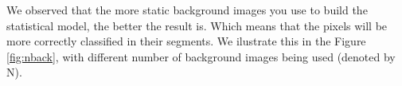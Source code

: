 \documentclass{article}
\begin{document}
	We observed that the more static background images you use to build the statistical model, the better the result is. Which means that the pixels will be more correctly classified in their segments. We ilustrate this in the Figure \ref{fig:nback}, with different number of background images being used (denoted by N). 

	\begin{figure}[H]
		  \centering
		  \hspace{0.1cm}

\end{figure}
\end{document}
